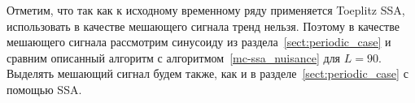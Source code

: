 \documentclass[specialist,
substylefile = spbu_report.rtx,
subf,href,colorlinks=true, 12pt]{disser}
\theoremstyle{definition}
\begin{document}
Отметим, что так как к исходному временному ряду применяется Toeplitz SSA, использовать в качестве мешающего сигнала тренд нельзя. Поэтому в качестве мешающего сигнала рассмотрим синусоиду из раздела~\ref{sect:periodic_case} и сравним описанный алгоритм с алгоритмом~\ref{mc-ssa_nuisance} для $L=90$. Выделять мешающий сигнал будем также, как и в разделе~\ref{sect:periodic_case} с помощью SSA.
\end{document}
